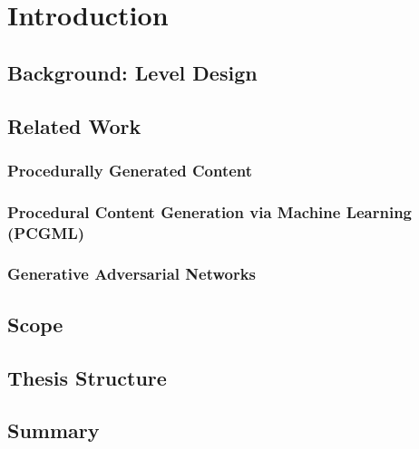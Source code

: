 \chapter{Introduction}

\section{Background: Level Design}
\section{Related Work}
\subsection{Procedurally Generated Content}
\subsection{Procedural Content Generation via Machine Learning (PCGML)}
\subsection{Generative Adversarial Networks}
\section{Scope}
\section{Thesis Structure}
\section{Summary}